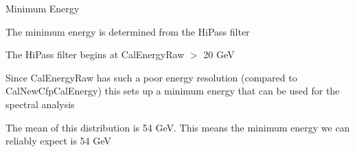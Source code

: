 \documentclass{article}
\begin{document}
\begin{myEnumerate}
\begin{myEnumerate}
				\item Minimum Energy
				\begin{myEnumerate}
					\item The minimum energy is determined from the HiPass filter
					\item The HiPass filter begins at CalEnergyRaw $>$ 20 GeV
					\item Since CalEnergyRaw has such a poor energy resolution (compared to CalNewCfpCalEnergy) this sets up a minimum energy that can be used for the spectral analysis
					\item The mean of this distribution is 54 GeV.  This means the minimum energy we can reliably expect is 54 GeV
				\end{myEnumerate}
			\end{myEnumerate}
	\end{myEnumerate}
\end{document}
